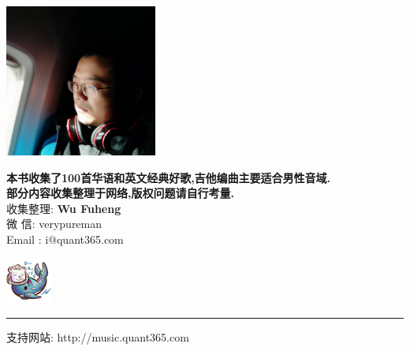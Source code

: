 
\begin{center}
\vspace{10mm}
\includegraphics[width=50mm]{img/me.png}\\
\vspace{10mm}
\vspace*{3\baselineskip}

\textbf{本书收集了100首华语和英文经典好歌,吉他编曲主要适合男性音域.}\\
\textbf{部分内容收集整理于网络,版权问题请自行考量.}\\


收集整理: \textbf{Wu Fuheng} \\
微    信: verypureman \\
Email   : i@quant365.com


\vspace{5mm}
\includegraphics[width=15mm,height=15mm]{img/merlion.png}\\

\end{center}

\vfill
\noindent\rule{6cm}{0.4pt}

支持网站: http://music.quant365.com \\
\pagebreak
